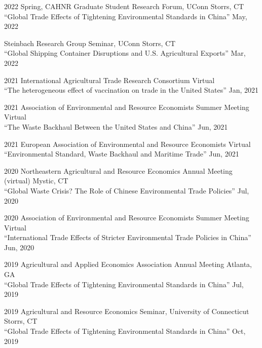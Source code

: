 \documentclass[11 pt,letterpaper]{article}
\renewenvironment{itemize}{
	\begin{list}{}{
			\setlength{\leftmargin}{1.5em}
		}
	}{
	\end{list}
}
\begin{document}
\begin{itemize}
		\item[-] 	2022 Spring, CAHNR Graduate Student Research Forum,  UConn \hfill Storrs, CT\vspace{0.15cm} \\ 
			``Global Trade Effects of Tightening Environmental Standards in China'' \hfill   May, 2022 
			
					\item[-] 	Steinbach Research Group Seminar, UConn \hfill Storrs, CT\vspace{0.15cm} \\
			``Global Shipping Container Disruptions and U.S. Agricultural Exports'' \hfill   Mar, 2022
			
		\item[-]	2021  International Agricultural Trade Research Consortium \hfill  Virtual\vspace{0.15cm}      \\
			``The heterogeneous effect of vaccination on trade in the United States'' \hfill   Jan, 2021 
		
		\item[-]  	2021  Association of Environmental and Resource Economists Summer Meeting \hfill  Virtual\vspace{0.15cm}  \\
		``The Waste Backhaul Between the United States and China'' \hfill   Jun, 2021 
		\item[-]  2021 European Association of Environmental and Resource Economists \hfill  Virtual\vspace{0.15cm}  \\
		``Environmental Standard, Waste Backhaul and Maritime Trade'' \hfill  Jun, 2021 
		
 
		
		\item[-] 2020  Northeastern Agricultural and Resource Economics Annual Meeting (virtual)    \hfill Mystic, CT \vspace{0.15cm} \\
				``Global Waste Crisis? The Role of Chinese Environmental Trade Policies'' \hfill  Jul, 2020 
		\item[-] 2020  Association of Environmental and Resource Economists  Summer Meeting  \hfill  Virtual\vspace{0.15cm} \\
				``International Trade Effects of Stricter Environmental Trade Policies in China'' \hfill   Jun, 2020 
		\item[-] 2019 Agricultural and Applied Economics Association  Annual Meeting \hfill Atlanta, GA\vspace{0.15cm} \\
				``Global Trade Effects of Tightening Environmental Standards in China''  \hfill Jul, 2019
		
		\item[-] 2019  Agricultural and Resource Economics Seminar, University of Connecticut    \hfill  Storrs, CT\vspace{0.15cm} \\
				``Global Trade Effects of Tightening Environmental Standards in China''  \hfill Oct, 2019
	\end{itemize}	
	
\end{document}
